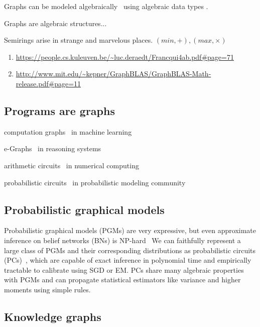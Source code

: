 \documentclass[11pt]{article}
\begin{document}
    Graphs can be modeled algebraically~\citep{weisfeiler1968reduction}  using algebraic data types \citep{mokhov2017algebraic}.

    Graphs are algebraic structures...

    Semirings arise in strange and marvelous places. $(min, +), (max, \times)$

    \begin{enumerate}
        \item \url{https://people.cs.kuleuven.be/~luc.deraedt/Francqui4ab.pdf#page=71}
        \item \url{http://www.mit.edu/~kepner/GraphBLAS/GraphBLAS-Math-release.pdf#page=11}
    \end{enumerate}

    \subsection{Programs are graphs}\label{sec:program-graphs}

    computation graphs~\citep{breuleux2017automatic} in machine learning

    e-Graphs~\citep{willsey2020egg} in reasoning systems

    arithmetic circuits~\citep{miller1988efficient} in numerical computing

    probabilistic circuits~\citep{choi2020probabilistic} in probabilistic modeling community

    \subsection{Probabilistic graphical models}\label{sec:pgms}

    Probabilistic graphical models (PGMs) are very expressive, but even approximate inference on belief networks (BNs) is NP-hard~\citep{dagum1993approximating} We can faithfully represent a large class of PGMs and their corresponding distributions as probabilistic circuits (PCs)~\citep{choi2020probabilistic}, which are capable of exact inference in polynomial time and empirically tractable to calibrate using SGD or EM. PCs share many algebraic properties with PGMs and can propagate statistical estimators like variance and higher moments using simple rules.

    \subsection{Knowledge graphs}
\end{document}
